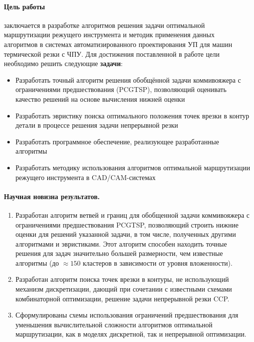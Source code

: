 \paragraph*{Цель работы}
заключается в разработке алгоритмов решения задачи оптимальной
маршрутизации режущего инструмента
и методик применения данных алгоритмов
в системах автоматизированного проектирования УП для машин термической резки с ЧПУ.
Для достижения поставленной в работе цели необходимо решить следующие
\textbf{задачи}:

\begin{itemize}
  \item
    Разработать точный алгоритм решения
    обобщённой задачи коммивояжера
    с ограничениями предшествования (PCGTSP),
    позволяющий оценивать качество решений
    на основе вычисления нижней оценки
  \item
    Разработать эвристику поиска оптимального положения
    точек врезки в контур детали в процессе решения задачи
    непрерывной резки
  \item
    Разработать программное обеспечение,
    реализующее разработанные алгоритмы
  \item
    Разработать методику использования алгоритмов
    оптимальной маршрутизации режущего инструмента
    в CAD/CAM-системах
\end{itemize}

\paragraph*{Научная новизна результатов.}

\begin{enumerate}
    \item
    Разработан алгоритм ветвей и границ для обобщенной задачи коммивояжера с ограничениями предшествования PCGTSP,
    позволяющий строить нижние оценки для решений указанной задачи,
    в том числе, полученных другими алгоритмами и эвристиками.
    Этот алгоритм способен находить точные решения
    для задач значительно большей размерности,
    чем известные алгоритмы
    (до $\approx 150$ кластеров в зависимости от уровня вложенности).
    \item
    Разработан алгоритм поиска точек врезки в контуры,
    не использующий механизм дискретизации,
    дающий при сочетании с известными схемами комбинаторной оптимизации,
    решение задачи непрерывной резки CCP.
    \item
    Сформулированы схемы использования ограничений предшествования
    для уменьшения вычислительной сложности алгоритмов оптимальной маршрутизации,
    как в моделях дискретной,
    так и непрерывной оптимизации.
\end{enumerate}

